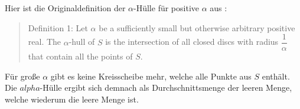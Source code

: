 \documentclass[12pt,a4paper]{scrartcl}
\begin{document}
Hier ist die Originaldefinition der $\alpha$-Hülle für positive $\alpha$ aus \cite{alpha1983}:
\begin{quotation}
Definition 1: Let $\alpha$ be a sufficiently small but otherwise arbitrary positive real. The $\alpha$-hull of $S$ is
the intersection of all closed discs with radius $\dfrac{1}{\alpha}$ that contain all the points of $S$.
\end{quotation}

Für große $\alpha$ gibt es keine Kreisscheibe mehr, welche alle Punkte aus $S$ enthält. Die $alpha$-Hülle ergibt sich
demnach als Durchschnittsmenge der leeren Menge, welche wiederum die leere Menge ist.

\printbibliography
\end{document}
